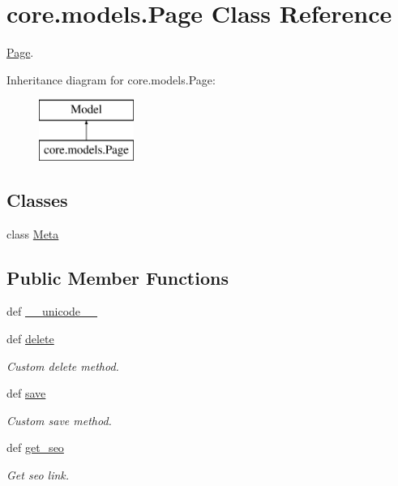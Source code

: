 \hypertarget{classcore_1_1models_1_1Page}{\section{core.\-models.\-Page Class Reference}
\label{classcore_1_1models_1_1Page}
}


\hyperlink{classcore_1_1models_1_1Page}{Page}.  


Inheritance diagram for core.\-models.\-Page\-:\begin{figure}[H]
\begin{center}
\leavevmode
\includegraphics[height=2.000000cm]{classcore_1_1models_1_1Page}
\end{center}
\end{figure}
\subsection*{Classes}
\begin{DoxyCompactItemize}
\item 
class \hyperlink{classcore_1_1models_1_1Page_1_1Meta}{Meta}
\end{DoxyCompactItemize}
\subsection*{Public Member Functions}
\begin{DoxyCompactItemize}
\item 
def \hyperlink{classcore_1_1models_1_1Page_a1438fd9de6724c34236b99148a7f0e14}{\-\_\-\-\_\-unicode\-\_\-\-\_\-}
\item 
def \hyperlink{classcore_1_1models_1_1Page_afeb78b5c518fe105f53207535d9ddb89}{delete}
\begin{DoxyCompactList}\small\item\em Custom delete method. \end{DoxyCompactList}\item 
def \hyperlink{classcore_1_1models_1_1Page_a17d5c6f2f5fecddd39a24b4934f163fe}{save}
\begin{DoxyCompactList}\small\item\em Custom save method. \end{DoxyCompactList}\item 
def \hyperlink{classcore_1_1models_1_1Page_ae8bb1e3e592ad6187bb4ae0d959a65a4}{get\-\_\-seo}
\begin{DoxyCompactList}\small\item\em Get seo link. \end{DoxyCompactList}\end{DoxyCompactItemize}

